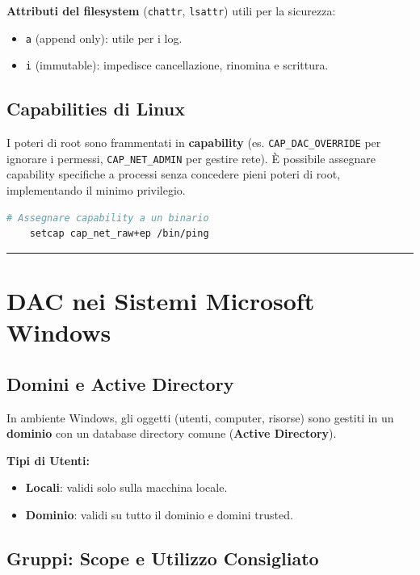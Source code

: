 \documentclass[12pt, a4paper]{report}
\begin{document}
\textbf{Attributi del filesystem} (\texttt{chattr}, \texttt{lsattr}) utili per la sicurezza:
\begin{itemize}
	\item \texttt{a} (append only): utile per i log.
	\item \texttt{i} (immutable): impedisce cancellazione, rinomina e scrittura.
\end{itemize}

\subsection{Capabilities di Linux}
I poteri di root sono frammentati in \textbf{capability} (es. \texttt{CAP\_DAC\_OVERRIDE} per ignorare i permessi, \texttt{CAP\_NET\_ADMIN} per gestire rete). È possibile assegnare capability specifiche a processi senza concedere pieni poteri di root, implementando il minimo privilegio.

\begin{lstlisting}[language=bash]
	# Assegnare capability a un binario
	setcap cap_net_raw+ep /bin/ping
\end{lstlisting}

\noindent\rule{\textwidth}{0.4pt}

\section{DAC nei Sistemi Microsoft Windows}

\subsection{Domini e Active Directory}
In ambiente Windows, gli oggetti (utenti, computer, risorse) sono gestiti in un \textbf{dominio} con un database directory comune (\textbf{Active Directory}).

\textbf{Tipi di Utenti:}
\begin{itemize}
	\item \textbf{Locali}: validi solo sulla macchina locale.
	\item \textbf{Dominio}: validi su tutto il dominio e domini trusted.
\end{itemize}

\subsection{Gruppi: Scope e Utilizzo Consigliato}
\end{document}
